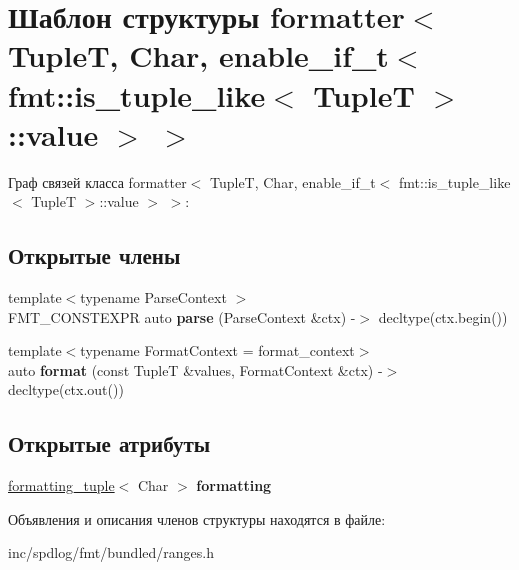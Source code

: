 \hypertarget{structformatter_3_01TupleT_00_01Char_00_01enable__if__t_3_01fmt_1_1is__tuple__like_3_01TupleT_01_4_1_1value_01_4_01_4}{}\section{Шаблон структуры formatter$<$ TupleT, Char, enable\+\_\+if\+\_\+t$<$ fmt\+:\+:is\+\_\+tuple\+\_\+like$<$ TupleT $>$\+:\+:value $>$ $>$}
\label{structformatter_3_01TupleT_00_01Char_00_01enable__if__t_3_01fmt_1_1is__tuple__like_3_01TupleT_01_4_1_1value_01_4_01_4}


Граф связей класса formatter$<$ TupleT, Char, enable\+\_\+if\+\_\+t$<$ fmt\+:\+:is\+\_\+tuple\+\_\+like$<$ TupleT $>$\+:\+:value $>$ $>$\+:
\subsection*{Открытые члены}
\begin{DoxyCompactItemize}
\item 
\mbox{\label{structformatter_3_01TupleT_00_01Char_00_01enable__if__t_3_01fmt_1_1is__tuple__like_3_01TupleT_01_4_1_1value_01_4_01_4_ad924ff0c32550c242ec16cddc3667b39}} 
{\footnotesize template$<$typename Parse\+Context $>$ }\\F\+M\+T\+\_\+\+C\+O\+N\+S\+T\+E\+X\+PR auto {\bfseries parse} (Parse\+Context \&ctx) -\/$>$ decltype(ctx.\+begin())
\item 
\mbox{\label{structformatter_3_01TupleT_00_01Char_00_01enable__if__t_3_01fmt_1_1is__tuple__like_3_01TupleT_01_4_1_1value_01_4_01_4_aa96a81177ffa5f2ad3fd83fb1ecb2eb3}} 
{\footnotesize template$<$typename Format\+Context  = format\+\_\+context$>$ }\\auto {\bfseries format} (const TupleT \&values, Format\+Context \&ctx) -\/$>$ decltype(ctx.\+out())
\end{DoxyCompactItemize}
\subsection*{Открытые атрибуты}
\begin{DoxyCompactItemize}
\item 
\mbox{\label{structformatter_3_01TupleT_00_01Char_00_01enable__if__t_3_01fmt_1_1is__tuple__like_3_01TupleT_01_4_1_1value_01_4_01_4_a6e7e8114530c13b0eb8ccea5811565f5}} 
\hyperlink{structformatting__tuple}{formatting\+\_\+tuple}$<$ Char $>$ {\bfseries formatting}
\end{DoxyCompactItemize}


Объявления и описания членов структуры находятся в файле\+:\begin{DoxyCompactItemize}
\item 
inc/spdlog/fmt/bundled/ranges.\+h\end{DoxyCompactItemize}
